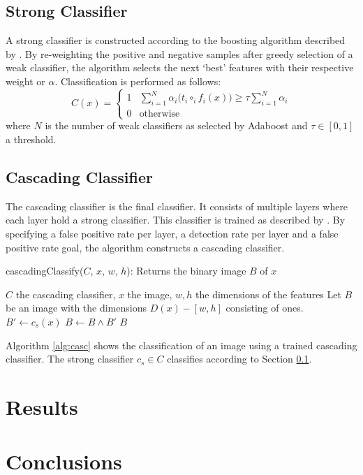 \documentclass[a4paper,11pt]{article}
\begin{document}
\subsection{Strong Classifier} \label{sec:strong}
A strong classifier is constructed according to the boosting algorithm
described by \cite{viola}. By re-weighting the positive and negative samples
after greedy selection of a weak classifier, the algorithm selects the next
`best' features with their respective weight or $\alpha$. Classification is
performed as follows:
\begin{displaymath}
C(x) = 
	\left\{ \begin{array}{ll}
		1 & \sum^N_{i=1} \alpha_i \big(t_i \circ_i f_i(x)\big) \ge \tau \sum^N_{i=1}\alpha_i \\
		0 & \textrm{otherwise}
	\end{array} \right.
\end{displaymath}
where $N$ is the number of weak classifiers as selected by Adaboost and $\tau
\in [0,1]$ a threshold.

\subsection{Cascading Classifier} \label{sec:casc}
The cascading classifier is the final classifier. It consists of multiple
layers where each layer hold a strong classifier. This classifier is trained as
described by \cite{viola}. By specifying a false positive rate per layer, a
detection rate per layer and a false positive rate goal, the algorithm
constructs a cascading classifier.
\begin{algorithm}
	\caption{cascadingClassify($C$, $x$, $w$, $h$): Returns the binary image $B$ of $x$}
	\begin{algorithmic}[1]
	\REQUIRE $C$ the cascading classifier, $x$ the image, $w,h$ the dimensions of the features
	\medskip
	\STATE Let $B$ be an image with the dimensions $D(x) - [w,h]$ consisting of ones.
		\STATE $B' \leftarrow c_s(x)$
		\STATE $B \leftarrow B \land B'$
	\ENDFOR
	\RETURN $B$
	\end{algorithmic}
\label{alg:casc}
\end{algorithm}
Algorithm \ref{alg:casc} shows the classification of an image using a trained
cascading classifier. The strong classifier $c_s \in C$ classifies according to
Section \ref{sec:strong}.

\section{Results} \label{sec:res}

\section{Conclusions} \label{sec:conc}

\renewcommand\bibname{References}


\end{document}
